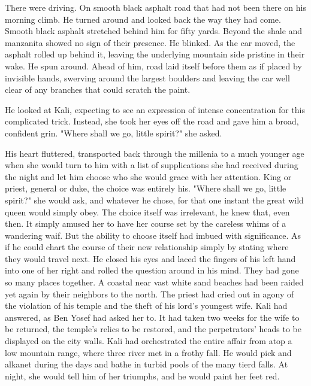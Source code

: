 \documentclass{amsart}
\begin{document}
There were driving. On smooth black asphalt road that had not been there on his morning climb. He turned around and looked back the way they had come. Smooth black asphalt stretched behind him for fifty yards. Beyond the shale and manzanita showed no sign of their presence. He blinked. As the car moved, the asphalt rolled up behind it, leaving the underlying mountain side pristine in their wake. He spun around. Ahead of him, road laid itself before them as if placed by invisible hands, swerving around the largest boulders and leaving the car well clear of any branches that could scratch the paint.

He looked at Kali, expecting to see an expression of intense concentration for this complicated trick. Instead, she took her eyes off the road and gave him a broad, confident grin. "Where shall we go, little spirit?" she asked.

His heart fluttered, transported back through the millenia to a much younger age when she would turn to him with a list of supplications she had received during the night and let him choose who she would grace with her attention. King or priest, general or duke, the choice was entirely his. "Where shall we go, little spirit?" she would ask, and whatever he chose, for that one instant the great wild queen would simply obey. The choice itself was irrelevant, he knew that, even then. It simply amused her to have her course set by the careless whims of a wandering waif. But the ability to choose itself had imbued with significance. As if he could chart the course of their new relationship simply by stating where they would travel next. He closed his eyes and laced the fingers of his left hand into one of her right and rolled the question around in his mind. They had gone so many places together. A coastal near vast white sand beaches had been raided yet again by their neighbors to the north. The priest had cried out in agony of the violation of his temple and the theft of his lord's youngest wife. Kali had answered, as Ben Yosef had asked her to. It had taken two weeks for the wife to be returned, the temple's relics to be restored, and the perpetrators' heads to be displayed on the city walls. Kali had orchestrated the entire affair from atop a low mountain range, where three river met in a frothy fall. He would pick and alkanet during the days and bathe in turbid pools of the many tierd falls. At night, she would tell him of her triumphs, and he would paint her feet red.
\end{document}
